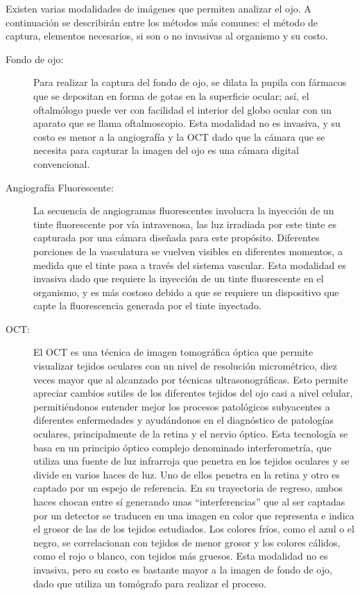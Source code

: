 Existen varias modalidades de imágenes que permiten analizar el ojo. A continuación se describirán entre los métodos más comunes: el método de captura, elementos necesarios, si son o no invasivas al organismo y su costo.

\begin{description}
\item[Fondo de ojo:] Para realizar la captura del fondo de ojo, se dilata la pupila con fármacos que se depositan en forma de gotas en la superficie ocular; así, el oftalmólogo puede ver con facilidad el interior del globo ocular con un aparato que se llama oftalmoscopio. Esta modalidad no es invasiva, y su costo es menor a la angiografía y la OCT dado que la cámara que se necesita para capturar la imagen del ojo es una cámara digital convencional.

\item[Angiografía Fluorescente:] La secuencia de angiogramas fluorescentes involucra la inyección de un tinte fluorescente por vía intravenosa, las luz irradiada por este tinte es capturada por una c\'amara diseñada para este prop\'osito. Diferentes porciones de la vasculatura se vuelven visibles en diferentes momentos, a medida que el tinte pasa a través del sistema vascular.  Esta modalidad es invasiva dado que requiere la inyección de  un tinte fluorescente en el organismo, y es más costoso debido a que se requiere un dispositivo que capte la fluorescencia generada por el tinte inyectado.


\item[OCT:] El OCT es una técnica de imagen tomográfica óptica que permite visualizar tejidos oculares con un nivel de resolución micrométrico, diez veces mayor que al alcanzado por técnicas ultrasonográficas. Esto permite apreciar cambios sutiles de los diferentes tejidos del ojo casi a nivel celular, permitiéndonos entender mejor los procesos patológicos subyacentes a diferentes enfermedades y ayudándonos en el diagnóstico de patologías oculares, principalmente de la retina y el nervio óptico. 
Esta tecnología se basa en un principio óptico complejo denominado interferometría, que utiliza una fuente de luz infrarroja que penetra en los tejidos oculares y se divide en varios haces de luz. Uno de ellos penetra en la retina y otro es captado por un espejo de referencia. En su trayectoria de regreso, ambos haces chocan entre sí generando unas “interferencias” que al ser captadas por un detector se traducen en una imagen en color que representa e indica el grosor de las de los tejidos estudiados. Los colores fríos, como el azul o el negro, se correlacionan con tejidos de menor grosor y los colores cálidos, como el rojo o blanco, con tejidos más gruesos.
Esta modalidad no es invasiva, pero su costo es bastante mayor a la imagen de fondo de ojo, dado que utiliza un tomógrafo para realizar el proceso.
\end{description}

